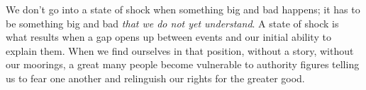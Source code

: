 We don't go into a state of shock when something big and bad happens; it has to
be something big and bad {\em that we do not yet understand}. A state of shock is
what results when a gap opens up between events and our initial ability to
explain them. When we find ourselves in that position, without a story, without
our moorings, a great many people become vulnerable to authority figures telling
us to fear one another and relinguish our rights for the greater good.
